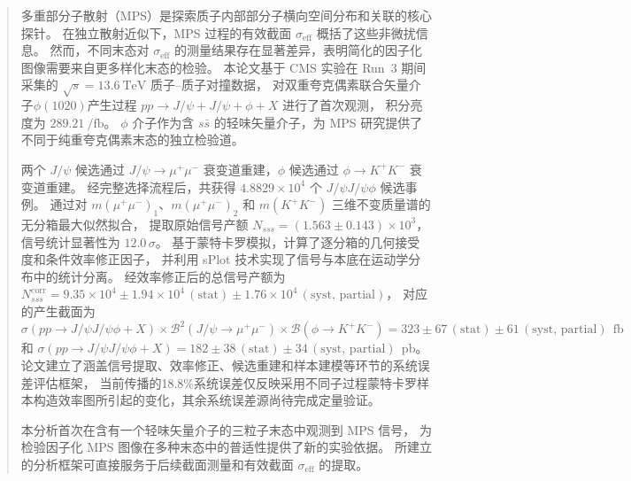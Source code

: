 

\begin{abstract}
  多重部分子散射（MPS）是探索质子内部部分子横向空间分布和关联的核心探针。
  在独立散射近似下，MPS 过程的有效截面 $\sigma_{\mathrm{eff}}$ 概括了这些非微扰信息。
  然而，不同末态对 $\sigma_{\mathrm{eff}}$ 的测量结果存在显著差异，表明简化的因子化图像需要来自更多样化末态的检验。
  本论文基于 CMS 实验在 Run~3 期间采集的 $\sqrt{s}=\SI{13.6}{\tera\eV}$ 质子--质子对撞数据，
  对双重夸克偶素联合矢量介子$\phi(1020)$产生过程 $pp \to J/\psi + J/\psi + \phi + X$ 进行了首次观测，
  积分亮度为 $\SI{289.21}{\per\femto\barn}$。
  $\phi$ 介子作为含 $s\bar{s}$ 的轻味矢量介子，为 MPS 研究提供了不同于纯重夸克偶素末态的独立检验道。

  两个 $J/\psi$ 候选通过 $J/\psi \to \mu^+\mu^-$ 衰变道重建，$\phi$ 候选通过 $\phi \to K^+K^-$ 衰变道重建。
  经完整选择流程后，共获得 $4.8829\times10^4$ 个 $J/\psi J/\psi \phi$ 候选事例。
  通过对 $m(\mu^+\mu^-)_1$、$m(\mu^+\mu^-)_2$ 和 $m(K^+K^-)$ 三维不变质量谱的无分箱最大似然拟合，
  提取原始信号产额 $N_{sss}=(1.563\pm0.143)\times10^3$，信号统计显著性为 $12.0\,\sigma$。
  基于蒙特卡罗模拟，计算了逐分箱的几何接受度和条件效率修正因子，
  并利用 sPlot 技术实现了信号与本底在运动学分布中的统计分离。
  经效率修正后的总信号产额为 $N_{sss}^{\mathrm{corr}} = 9.35 \times 10^4 \pm 1.94 \times 10^4\,(\mathrm{stat}) \pm 1.76 \times 10^4\,(\mathrm{syst,\,partial})$，
  对应的产生截面为 $\sigma(pp \to J/\psi J/\psi \phi + X) \times \mathcal{B}^2(J/\psi \to \mu^+\mu^-) \times \mathcal{B}(\phi \to K^+K^-) = 323 \pm 67\,(\mathrm{stat}) \pm 61\,(\mathrm{syst,\,partial})~\SI{}{\femto\barn}$
  和 $\sigma(pp \to J/\psi J/\psi \phi + X) = 182 \pm 38\,(\mathrm{stat}) \pm 34\,(\mathrm{syst,\,partial})~\SI{}{\pico\barn}$。
  论文建立了涵盖信号提取、效率修正、候选重建和样本建模等环节的系统误差评估框架，
  当前传播的18.8\%系统误差仅反映采用不同子过程蒙特卡罗样本构造效率图所引起的变化，其余系统误差源尚待完成定量验证。

  本分析首次在含有一个轻味矢量介子的三粒子末态中观测到 MPS 信号，
  为检验因子化 MPS 图像在多种末态中的普适性提供了新的实验依据。
  所建立的分析框架可直接服务于后续截面测量和有效截面 $\sigma_{\mathrm{eff}}$ 的提取。

\end{abstract}


